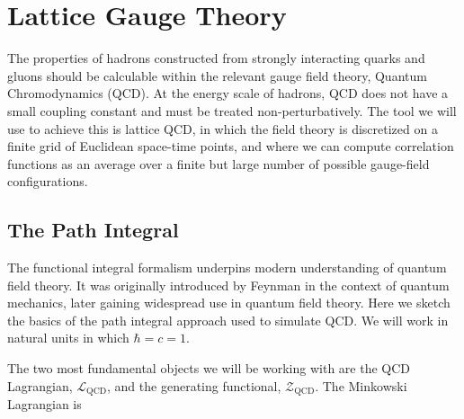 \chapter{Lattice Gauge Theory} \label{chap::lattice_gauge_thy}

The properties of hadrons constructed from strongly interacting quarks and gluons should be calculable within the relevant gauge field theory, Quantum Chromodynamics (QCD). At the energy scale of hadrons, QCD does not have a small coupling constant and must be treated non-perturbatively. The tool we will use to achieve this is lattice QCD, in which the field theory is discretized on a finite grid of Euclidean space-time points, and where we can compute correlation functions as an average over a finite but large number of possible gauge-field configurations. 


\section{The Path Integral  } \label{QCD::path_integral}
The functional integral formalism underpins modern understanding of quantum field theory. It was originally introduced by Feynman in the context of quantum mechanics, later gaining widespread use in quantum field theory. Here we sketch the basics of the path integral approach used to simulate QCD.  We will work in natural units in which $\hbar = c = 1$.  


The two most fundamental objects we will be working with are the QCD Lagrangian, $\mathcal{L}_{\mathrm{QCD}}$, and the generating functional, $\mathcal{Z}_{\mathrm{QCD}}$. The Minkowski Lagrangian is

